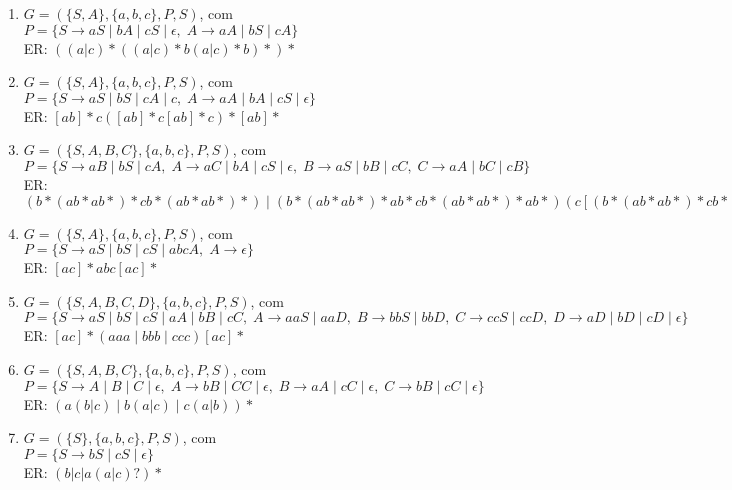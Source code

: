 \begin{enumerate}
    \item[30)] 
    $G = (\{S,A\}, \{a,b,c\}, P, S)$, com \\
    $P = \{ S \to aS \mid bA \mid cS \mid \epsilon,\;
    A \to aA \mid bS \mid cA \}$ \\[6pt]
    ER: $((a|c)*((a|c)*b(a|c)*b)*)*$

    \item[31)] 
    $G = (\{S,A\}, \{a,b,c\}, P, S)$, com \\
    $P = \{ S \to aS \mid bS \mid cA \mid c,\;
    A \to aA \mid bA \mid cS \mid \epsilon \}$ \\[6pt]
    ER: $[ab]*c([ab]*c[ab]*c)*[ab]*$

    \item[32)] 
    $G = (\{S,A,B,C\}, \{a,b,c\}, P, S)$, com \\
    $P = \{ 
    S \to aB \mid bS \mid cA,\;
    A \to aC \mid bA \mid cS \mid \epsilon,\;
    B \to aS \mid bB \mid cC,\;
    C \to aA \mid bC \mid cB \}$ \\[6pt]
    ER: $(b*(ab*ab*)*cb*(ab*ab*)*) \mid (b*(ab*ab*)*ab*cb*(ab*ab*)*ab*)(c[(b*(ab*ab*)*cb*(ab*ab*)*) \mid (b*(ab*ab*)*ab*cb*(ab*ab*)*ab*)])* $

    \item[33)] 
    $G = (\{S,A\}, \{a,b,c\}, P, S)$, com \\
    $P = \{ 
    S \to aS \mid bS \mid cS \mid abcA,\;
    A \to \epsilon \}$ \\[6pt]
    ER: $[ac]*abc[ac]*$

    \item[34)] 
    $G = (\{S,A,B,C,D\}, \{a,b,c\}, P, S)$, com \\
    $P = \{ 
    S \to aS \mid bS \mid cS \mid aA \mid bB \mid cC,\;
    A \to aaS \mid aaD,\;
    B \to bbS \mid bbD,\;
    C \to ccS \mid ccD,\;
    D \to aD \mid bD \mid cD \mid \epsilon \}$ \\[6pt]
    ER: $[ac]*(aaa \mid bbb \mid ccc)[ac]*$

    \item[35)] 
    $G = (\{S,A,B,C\}, \{a,b,c\}, P, S)$, com \\
    $P = \{ 
    S \to A \mid B \mid C \mid \epsilon,\;
    A \to bB \mid CC \mid \epsilon,\;
    B \to aA \mid cC \mid \epsilon,\;
    C \to bB \mid cC \mid \epsilon \}$ \\[6pt]
    ER: $(a(b|c) \mid b(a|c) \mid c(a|b))*$

    \item[36)] 
    $G = (\{S\}, \{a,b,c\}, P, S)$, com \\
    $P = \{ S \to bS \mid cS \mid \epsilon \}$ \\[6pt]
    ER: $(b|c|a(a|c)?)*$


\end{enumerate}
